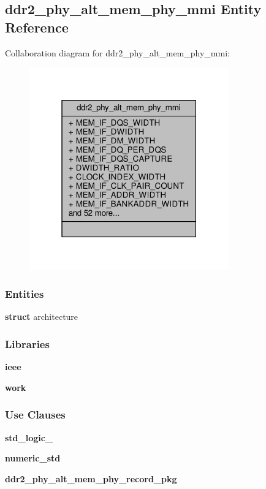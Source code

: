 \subsection{ddr2\+\_\+phy\+\_\+alt\+\_\+mem\+\_\+phy\+\_\+mmi Entity Reference}
\label{classddr2__phy__alt__mem__phy__mmi}


Collaboration diagram for ddr2\+\_\+phy\+\_\+alt\+\_\+mem\+\_\+phy\+\_\+mmi\+:\nopagebreak
\begin{figure}[H]
\begin{center}
\leavevmode
\includegraphics[width=244pt]{da/d7b/classddr2__phy__alt__mem__phy__mmi__coll__graph}
\end{center}
\end{figure}
\subsubsection*{Entities}
\begin{DoxyCompactItemize}
\item 
{\bf struct} architecture
\end{DoxyCompactItemize}
\subsubsection*{Libraries}
 \begin{DoxyCompactItemize}
\item 
{\bf ieee} 
\item 
{\bf work} 
\end{DoxyCompactItemize}
\subsubsection*{Use Clauses}
 \begin{DoxyCompactItemize}
\item 
{\bf std\+\_\+logic\+\_}   
\item 
{\bf numeric\+\_\+std}   
\item 
{\bf ddr2\+\_\+phy\+\_\+alt\+\_\+mem\+\_\+phy\+\_\+record\+\_\+pkg}   
\end{DoxyCompactItemize}
